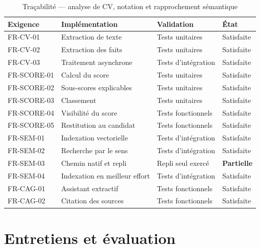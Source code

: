\begin{table}[htbp]
  \centering
  \caption{Traçabilité — analyse de CV, notation et rapprochement sémantique}
  \begin{tabularx}{\textwidth}{L{2.3cm} L{3.4cm} L{3.0cm} X}
    \toprule
    \textbf{Exigence} & \textbf{Implémentation} & \textbf{Validation} & \textbf{État} \\
    \midrule
    FR-CV-01    & Extraction de texte & Tests unitaires & Satisfaite \\
    FR-CV-02    & Extraction des faits & Tests unitaires & Satisfaite \\
    FR-CV-03    & Traitement asynchrone & Tests d'intégration & Satisfaite \\
    FR-SCORE-01 & Calcul du score & Tests unitaires & Satisfaite \\
    FR-SCORE-02 & Sous-scores explicables & Tests unitaires & Satisfaite \\
    FR-SCORE-03 & Classement & Tests unitaires & Satisfaite \\
    FR-SCORE-04 & Visibilité du score & Tests fonctionnels & Satisfaite \\
    FR-SCORE-05 & Restitution au candidat & Tests fonctionnels & Satisfaite \\
    FR-SEM-01   & Indexation vectorielle & Tests d'intégration & Satisfaite \\
    FR-SEM-02   & Recherche par le sens & Tests d'intégration & Satisfaite \\
    FR-SEM-03   & Chemin natif et repli & Repli seul exercé & \textbf{Partielle} \\
    FR-SEM-04   & Indexation en meilleur effort & Tests d'intégration & Satisfaite \\
    FR-CAG-01   & Assistant extractif & Tests fonctionnels & Satisfaite \\
    FR-CAG-02   & Citation des sources & Tests fonctionnels & Satisfaite \\
    \bottomrule
  \end{tabularx}
\end{table}

\section{Entretiens et évaluation}

